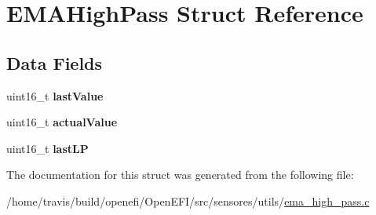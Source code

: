 \hypertarget{structEMAHighPass}{}\section{E\+M\+A\+High\+Pass Struct Reference}
\label{structEMAHighPass}
\subsection*{Data Fields}
\begin{DoxyCompactItemize}
\item 
uint16\+\_\+t {\bfseries last\+Value}\hypertarget{structEMAHighPass_a53df4bb1628740263789e44d94d75b26}{}\label{structEMAHighPass_a53df4bb1628740263789e44d94d75b26}

\item 
uint16\+\_\+t {\bfseries actual\+Value}\hypertarget{structEMAHighPass_a405250df44c61a455d676a0f13bfe32b}{}\label{structEMAHighPass_a405250df44c61a455d676a0f13bfe32b}

\item 
uint16\+\_\+t {\bfseries last\+LP}\hypertarget{structEMAHighPass_a38075a21f728f8d39f150825dbc45ef5}{}\label{structEMAHighPass_a38075a21f728f8d39f150825dbc45ef5}

\end{DoxyCompactItemize}


The documentation for this struct was generated from the following file\+:\begin{DoxyCompactItemize}
\item 
/home/travis/build/openefi/\+Open\+E\+F\+I/src/sensores/utils/\hyperlink{ema__high__pass_8c}{ema\+\_\+high\+\_\+pass.\+c}\end{DoxyCompactItemize}
